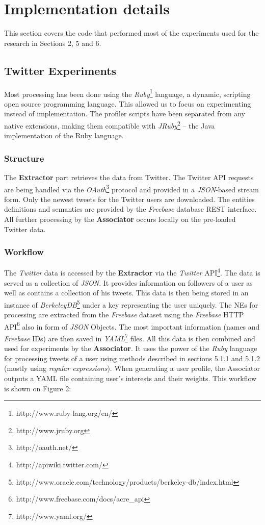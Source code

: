 \section{Implementation details}
This section covers the code that performed most of the experiments used for the research in Sections 2, 5 and 6.

\subsection{Twitter Experiments}
Most processing has been done using the \textit{Ruby}\footnote{http://www.ruby-lang.org/en/}
language, a dynamic, scripting open source programming language. This allowed us
to focus on experimenting instead of implementation. The profiler scripts have been
separated from any native extensions, making them compatible with \textit{JRuby}\footnote{http://www.jruby.org} -- the Java implementation
of the Ruby language.

\subsubsection{Structure}
The \textbf{Extractor} part retrieves the data from Twitter. The Twitter API requests are being handled via the \textit{OAuth}\footnote{http://oauth.net/} protocol and provided in a
\textit{JSON}-based stream form. Only the newest tweets for the Twitter
users are downloaded. The entities definitions and semantics are provided by
the \textit{Freebase} database REST interface. All further processing by the \textbf{Associator}
occurs locally on the pre-loaded Twitter data.

\subsubsection{Workflow}

The \textit{Twitter} data is accessed by the \textbf{Extractor} via the \textit{Twitter}
API\footnote{http://apiwiki.twitter.com/}. The data is served as a collection of \textit{JSON}. It provides
information on followers of a user as well as contains a collection of his tweets. This data is then being
stored in an instance of \textit{BerkeleyDB}\footnote{http://www.oracle.com/technology/products/berkeley-db/index.html}
under a key representing the user uniquely. The NEs for processing are extracted from the \textit{Freebase}
dataset using the \textit{Freebase} HTTP API\footnote{http://www.freebase.com/docs/acre\_api} also in
form of \textit{JSON} Objects. The most important information (names and \textit{Freebase} IDs) are then
saved in \textit{YAML}\footnote{http://www.yaml.org/} files. All this data is then combined and used
for experiments by the \textbf{Associator}. It uses the power of the \textit{Ruby} language for processing tweets
of a user using methods described in sections 5.1.1 and 5.1.2 (mostly using \textit{regular expressions}).
When generating a user profile, the Associator outputs a YAML file containing user's interests and
their weights. This workflow is shown on Figure 2:

